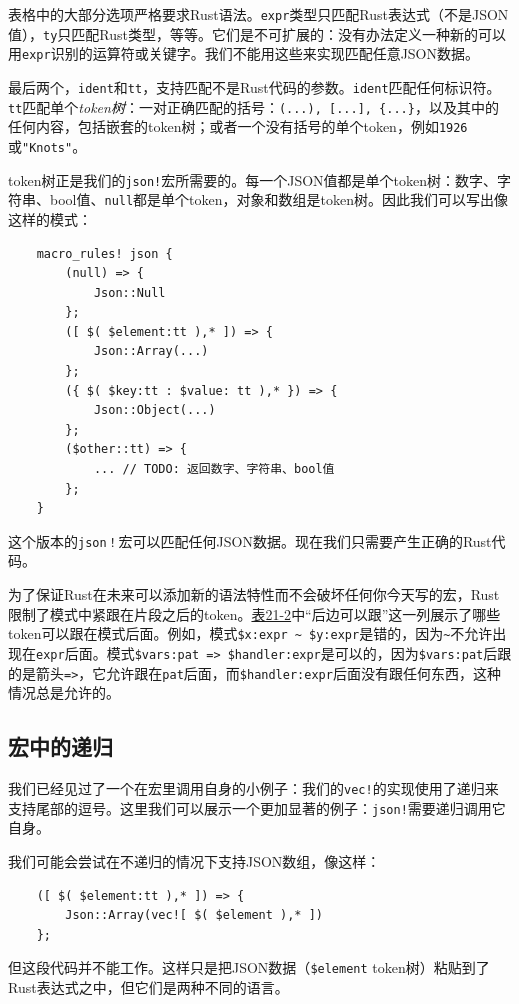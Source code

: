 表格中的大部分选项严格要求Rust语法。\texttt{expr}类型只匹配Rust表达式（不是JSON值），\texttt{ty}只匹配Rust类型，等等。它们是不可扩展的：没有办法定义一种新的可以用\texttt{expr}识别的运算符或关键字。我们不能用这些来实现匹配任意JSON数据。

最后两个，\texttt{ident}和\texttt{tt}，支持匹配不是Rust代码的参数。\texttt{ident}匹配任何标识符。\texttt{tt}匹配单个\emph{token树}：一对正确匹配的括号：\texttt{(...), [...], \{...\}}，以及其中的任何内容，包括嵌套的token树；或者一个没有括号的单个token，例如\texttt{1926}或\texttt{"Knots"}。

token树正是我们的\texttt{json!}宏所需要的。每一个JSON值都是单个token树：数字、字符串、bool值、\texttt{null}都是单个token，对象和数组是token树。因此我们可以写出像这样的模式：
\begin{verbatim}
    macro_rules! json {
        (null) => {
            Json::Null
        };
        ([ $( $element:tt ),* ]) => {
            Json::Array(...)
        };
        ({ $( $key:tt : $value: tt ),* }) => {
            Json::Object(...)
        };
        ($other::tt) => {
            ... // TODO: 返回数字、字符串、bool值
        };
    }
\end{verbatim}

这个版本的\texttt{json！}宏可以匹配任何JSON数据。现在我们只需要产生正确的Rust代码。

为了保证Rust在未来可以添加新的语法特性而不会破坏任何你今天写的宏，Rust限制了模式中紧跟在片段之后的token。\hyperref[t21-2]{表21-2}中“后边可以跟”这一列展示了哪些token可以跟在模式后面。例如，模式\texttt{\$x:expr \textasciitilde{} \$y:expr}是错的，因为\texttt{\textasciitilde{}}不允许出现在\texttt{expr}后面。模式\texttt{\$vars:pat => \$handler:expr}是可以的，因为\texttt{\$vars:pat}后跟的是箭头\texttt{=>}，它允许跟在\texttt{pat}后面，而\texttt{\$handler:expr}后面没有跟任何东西，这种情况总是允许的。

\subsection{宏中的递归}
我们已经见过了一个在宏里调用自身的小例子：我们的\texttt{vec!}的实现使用了递归来支持尾部的逗号。这里我们可以展示一个更加显著的例子：\texttt{json!}需要递归调用它自身。

我们可能会尝试在不递归的情况下支持JSON数组，像这样：
\begin{verbatim}
    ([ $( $element:tt ),* ]) => {
        Json::Array(vec![ $( $element ),* ])
    };
\end{verbatim}
但这段代码并不能工作。这样只是把JSON数据（\texttt{\$element} token树）粘贴到了Rust表达式之中，但它们是两种不同的语言。

